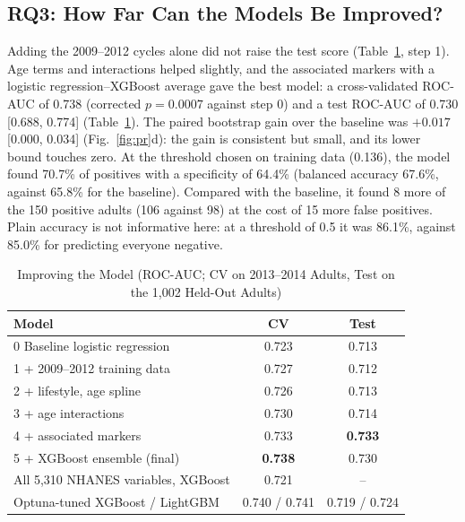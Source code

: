 \documentclass[conference]{IEEEtran}
\begin{document}
\subsection{RQ3: How Far Can the Models Be Improved?}
\label{sec:rq3}
Adding the 2009--2012 cycles alone did not raise the test score (Table~\ref{tab:steps}, step 1). Age terms and interactions helped
slightly, and the associated markers with a logistic regression--XGBoost average gave the best model: a cross-validated ROC-AUC of
0.738 (corrected $p=0.0007$ against step 0) and a test ROC-AUC of 0.730 [0.688, 0.774] (Table~\ref{tab:steps}). The paired bootstrap gain
over the baseline was $+0.017$ [0.000, 0.034] (Fig.~\ref{fig:pr}d): the gain is consistent but small, and its lower bound touches
zero.
At the threshold chosen on training data (0.136), the model found 70.7\% of positives with a specificity of 64.4\% (balanced
accuracy 67.6\%, against 65.8\% for the baseline). Compared with the baseline, it found 8 more of the 150 positive adults (106 against
98) at the cost of 15 more false positives. Plain accuracy is not informative here: at a threshold of 0.5 it was
86.1\%, against 85.0\% for predicting everyone negative.

\begin{table}[t]
\caption{Improving the Model (ROC-AUC; CV on 2013--2014 Adults, Test on the 1,002 Held-Out Adults)}
\label{tab:steps}
\centering
\begin{tabular}{@{}lcc@{}}
\toprule
Model & CV & Test \\
\midrule
0 Baseline logistic regression & 0.723 & 0.713 \\
1 + 2009--2012 training data & 0.727 & 0.712 \\
2 + lifestyle, age spline & 0.726 & 0.713 \\
3 + age interactions & 0.730 & 0.714 \\
4 + associated markers & 0.733 & \textbf{0.733} \\
5 + XGBoost ensemble (final) & \textbf{0.738} & 0.730 \\
\midrule
All 5,310 NHANES variables, XGBoost & 0.721 & -- \\
Optuna-tuned XGBoost / LightGBM & 0.740 / 0.741 & 0.719 / 0.724 \\
\bottomrule
\end{tabular}
\end{table}
\end{document}
